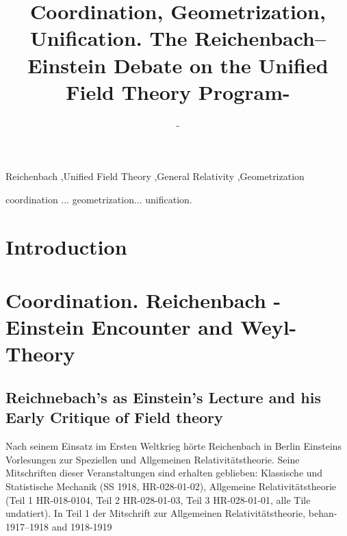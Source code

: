 \documentclass[draft]{article}
\title{Coordination, Geometrization, Unification. The Reichenbach--Einstein Debate on the Unified Field Theory Program}
\title{-}
\author{-}
\begin{document}
\maketitle

\begin{abstract}
\lipsum*[1-2]
\end{abstract}


\begin{keywords}
Reichenbach \sep Unified Field Theory \sep General Relativity \sep Geometrization	
\end{keywords}


coordination ... geometrization... unification.


\section*{Introduction}

\lipsum*[1-4]

\section{Coordination. Reichenbach - Einstein Encounter and Weyl-Theory}

\subsection{Reichnebach's as Einstein's Lecture and his Early Critique of Field theory}

Nach seinem Einsatz im Ersten Weltkrieg hörte Reichenbach in Berlin Einsteins Vorlesungen zur Speziellen und Allgemeinen Relativitätstheorie. Seine Mitschriften dieser Veranstaltungen sind erhalten geblieben: Klassische und Statistische Mechanik (SS 1918, HR-028-01-02), Allgemeine Relativitätstheorie (Teil 1 HR-018-0104, Teil 2 HR-028-01-03, Teil 3 HR-028-01-01, alle Tile undatiert). In Teil 1 der Mitschrift zur Allgemeinen Relativitätstheorie, behan- 1917--1918 and 1918-1919
\end{document}
